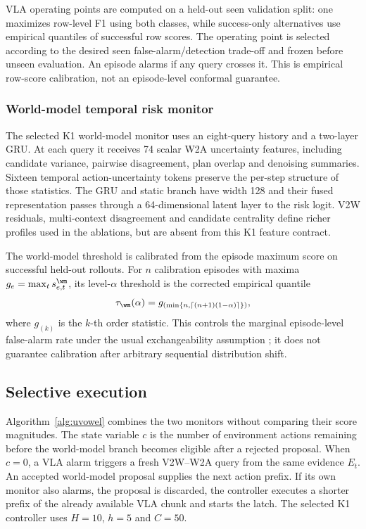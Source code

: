 VLA operating points are computed on a held-out seen validation split: one
maximizes row-level F1 using both classes, while success-only alternatives use
empirical quantiles of successful row scores. The operating point is selected
according to the desired seen false-alarm/detection trade-off and frozen before
unseen evaluation. An episode alarms if any query crosses it. This is empirical
row-score calibration, not an episode-level conformal guarantee.

\subsubsection{World-model temporal risk monitor}

The selected K1 world-model monitor uses an eight-query history and a
two-layer GRU. At each query it receives 74 scalar W2A uncertainty features,
including candidate variance, pairwise disagreement, plan overlap and
denoising summaries. Sixteen temporal action-uncertainty tokens preserve the
per-step structure of those statistics. The GRU and static branch have width
128 and their fused representation passes through a 64-dimensional latent
layer to the risk logit. V2W residuals, multi-context disagreement and
candidate centrality define richer profiles used in the ablations, but are
absent from this K1 feature contract.

The world-model threshold is calibrated from the episode maximum score on
successful held-out rollouts. For \(n\) calibration episodes with maxima
\(g_e=\max_t s_{e,t}^{\wm}\), its level-\(\alpha\) threshold is the corrected
empirical quantile
\begin{equation}
  \tau_\wm(\alpha)
  =
  g_{(\min\{n,\lceil(n+1)(1-\alpha)\rceil\})},
  \label{eq:wm-conformal-threshold}
\end{equation}
where \(g_{(k)}\) is the \(k\)-th order statistic. This controls the marginal
episode-level false-alarm rate under the usual exchangeability assumption
\cite{conformal}; it does not guarantee calibration after arbitrary sequential
distribution shift.

\subsection{Selective execution}

Algorithm~\ref{alg:uvowel} combines the two monitors without comparing their
score magnitudes. The state variable \(c\) is the number of environment actions
remaining before the world-model branch becomes eligible after a rejected
proposal. When \(c=0\), a VLA alarm triggers a fresh V2W--W2A query from the
same evidence \(E_t\). An accepted world-model proposal supplies the next
action prefix. If its own monitor also alarms, the proposal is discarded, the
controller executes a shorter prefix of the already available VLA chunk and
starts the latch. The selected K1 controller uses \(H=10\), \(h=5\) and
\(C=50\).

